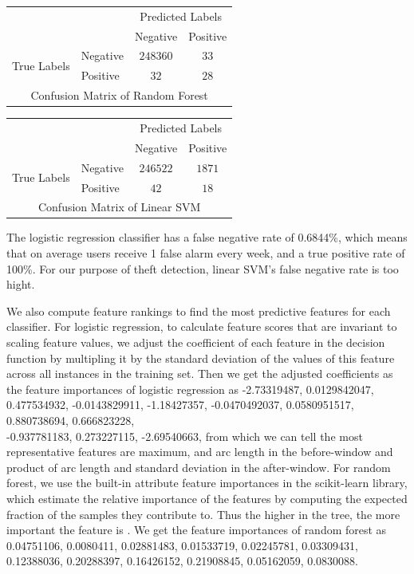 \documentclass{soups}
\begin{document}
\begin{tabular}{l|l|c|c|}
\multicolumn{2}{c}{} &\multicolumn{2}{c}{Predicted Labels}\\
\cline{3-4}
\multicolumn{2}{c|}{}&Negative&Positive \\
\cline{2-4}
\multirow{2}{*}{True Labels}& Negative  & $248360$ & $33$ \\
\cline{2-4}
& Positive & $32$ & $28$ \\
\cline{2-4}
\multicolumn{4}{c}{Confusion Matrix of Random Forest} 
\end{tabular}

\begin{tabular}{l|l|c|c|}
\multicolumn{2}{c}{} &\multicolumn{2}{c}{Predicted Labels}\\
\cline{3-4}
\multicolumn{2}{c|}{}&Negative&Positive \\
\cline{2-4}
\multirow{2}{*}{True Labels}& Negative  & $246522$ & $1871$ \\
\cline{2-4}
& Positive & $42$ & $18$ \\
\cline{2-4}
\multicolumn{4}{c}{Confusion Matrix of Linear SVM} 
\end{tabular}


The logistic regression classifier has a false negative rate of 0.6844\%, which means that on average users receive 1 false alarm every week, and a true positive rate of 100\%. For our purpose of theft detection, linear SVM's false negative rate is too hight.

We also compute feature rankings to find the most predictive features for each classifier. For logistic regression, to calculate feature scores that are invariant to scaling feature values, we adjust the coefficient of each feature in the decision function by multipling it by the standard deviation of the values of this feature across all instances in the training set. Then we get the adjusted coefficients as the feature importances of logistic regression as -2.73319487, 0.0129842047, 0.477534932, -0.0143829911, -1.18427357, -0.0470492037, 0.0580951517, 0.880738694, 0.666823228, \\ -0.937781183, 0.273227115, -2.69540663, from which we can tell the most representative features are maximum, and arc length in the before-window and product of arc length and standard deviation in the after-window. For random forest, we use the built-in attribute feature importances in the scikit-learn library, which estimate the relative importance of the features by computing the expected fraction of the samples they contribute to. Thus the higher in the tree, the more important the feature is \cite{sklearn:rfdoc}. We get the feature importances of random forest as 0.04751106, 0.0080411, 0.02881483, 0.01533719, 0.02245781, 0.03309431, 0.12388036, 0.20288397, 0.16426152, 0.21908845, 0.05162059, 0.0830088.
\end{document}
